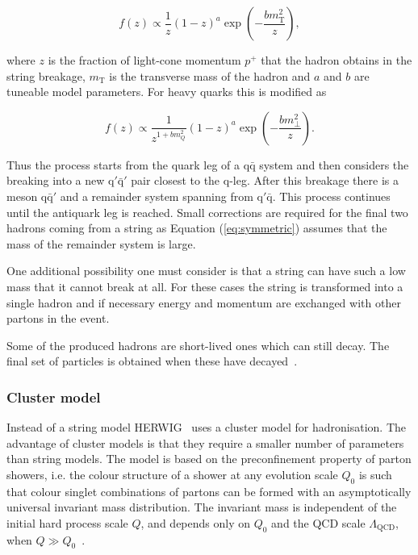 \begin{equation}
f\left(z\right) \propto \frac{1}{z} \left(1-z\right)^a \exp \left(-\frac{b m_\mathrm{T} ^2}{z} \right),
\label{eq:symmetric}
\end{equation}

\noindent where $z$ is the fraction of light-cone momentum $p^+$ that the hadron obtains in the string breakage, $m_\mathrm{T}$ is the transverse mass of the hadron and $a$ and $b$ are tuneable model parameters. For heavy quarks this is modified as 

\begin{equation}
f\left(z\right) \propto \frac{1}{z^{1+bm_Q^2}} \left(1-z\right)^a \exp \left(-\frac{b m_\perp ^2}{z} \right).
\label{eq:symmetric2}
\end{equation}

\noindent Thus the process starts from the quark leg of a $\mathrm{q \bar{q}}$ system and then considers the breaking into a new $\mathrm{q' \bar q'}$ pair closest to the q-leg. After this breakage there is a meson $\mathrm{q \bar{q}'}$ and a remainder system spanning from $\mathrm{q' \bar{q}}$. This process continues until the antiquark leg is reached. Small corrections are required for the final two hadrons coming from a string as Equation (\ref{eq:symmetric}) assumes that the mass of the remainder system is large.

One additional possibility one must consider is that a string can have such a low mass that it cannot break at all. For these cases the string is transformed into a single hadron and if necessary energy and momentum are exchanged with other partons in the event.

Some of the produced hadrons are short-lived ones which can still decay. The final set of particles is obtained when these have decayed~\cite{introPythia82}.


\subsubsection*{Cluster model}
Instead of a string model HERWIG~\cite{herwigManual} uses a cluster model for hadronisation. The advantage of cluster models is that they require a smaller number of parameters than string models. The model is based on the preconfinement property of parton showers, i.e. the colour structure of a shower at any evolution scale $Q_0$ is such that colour singlet combinations of partons can be formed with an asymptotically universal invariant mass distribution. The invariant mass is independent of the initial hard process scale $Q$, and depends only on $Q_0$ and the QCD scale $\Lambda _ \mathrm{QCD}$, when $Q \gg Q_0$~\cite{eventGenerators}.

